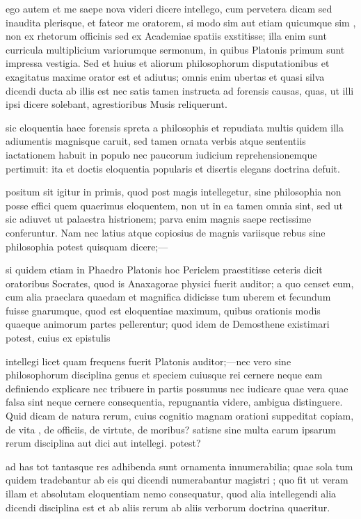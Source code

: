  ego autem et me saepe nova videri dicere intellego, cum pervetera dicam sed inaudita plerisque, et fateor me oratorem, si modo sim aut etiam quicumque sim , non ex rhetorum officinis sed ex Academiae spatiis exstitisse; illa enim sunt curricula multiplicium variorumque sermonum, in quibus Platonis primum sunt impressa vestigia. Sed et huius et aliorum philosophorum disputationibus et exagitatus maxime orator est et adiutus; omnis enim ubertas et quasi silva dicendi ducta ab illis est nec satis tamen instructa ad forensis causas, quas, ut illi ipsi dicere solebant, agrestioribus Musis reliquerunt.

 sic eloquentia haec forensis spreta a philosophis et repudiata multis quidem illa adiumentis magnisque caruit, sed tamen ornata verbis atque sententiis iactationem habuit in populo nec paucorum iudicium reprehensionemque pertimuit: ita et doctis eloquentia popularis et disertis elegans doctrina defuit.

 positum sit igitur in primis, quod post magis intellegetur, sine philosophia non posse effici quem quaerimus eloquentem, non ut in ea tamen omnia sint, sed ut sic adiuvet ut palaestra histrionem; parva enim magnis saepe rectissime conferuntur. Nam nec latius atque copiosius de magnis variisque rebus sine philosophia potest quisquam dicere;—

 si quidem etiam in Phaedro Platonis hoc Periclem praestitisse ceteris dicit oratoribus Socrates, quod is Anaxagorae physici fuerit auditor; a quo censet eum, cum alia praeclara quaedam et magnifica didicisse tum uberem et fecundum fuisse gnarumque, quod est eloquentiae maximum, quibus orationis modis quaeque animorum partes pellerentur; quod idem de Demosthene existimari potest, cuius ex epistulis

 intellegi licet quam frequens fuerit Platonis auditor;—nec vero sine philosophorum disciplina genus et speciem cuiusque rei cernere neque eam definiendo explicare nec tribuere in partis possumus nec iudicare quae vera quae falsa sint neque cernere consequentia, repugnantia videre, ambigua distinguere. Quid dicam de natura rerum, cuius cognitio magnam orationi suppeditat copiam, de vita , de officiis, de virtute, de moribus? satisne sine multa earum ipsarum rerum disciplina aut dici aut intellegi. potest?

 ad has tot tantasque res adhibenda sunt ornamenta innumerabilia; quae sola tum quidem tradebantur ab eis qui dicendi numerabantur magistri ; quo fit ut veram illam et absolutam eloquentiam nemo consequatur, quod alia intellegendi alia dicendi disciplina est et ab aliis rerum ab aliis verborum doctrina quaeritur.

